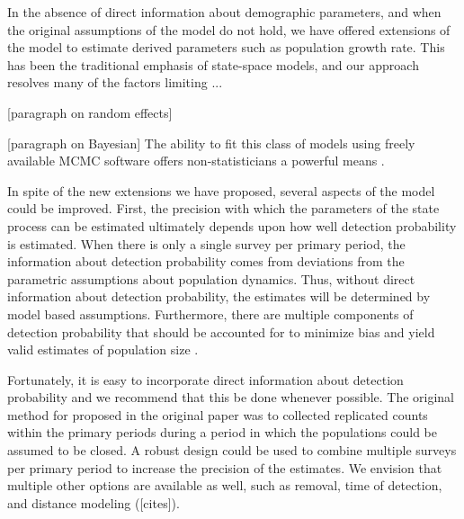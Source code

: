 \documentclass[12pt]{article}
\begin{document}
In the absence of direct information about demographic parameters, and
when the original assumptions of the model do not hold, we have
offered extensions of the model to estimate derived parameters such as
population growth rate. This has been the traditional emphasis of
state-space models, and our approach resolves many of the factors
limiting ...

[paragraph on random effects]


[paragraph on Bayesian]
The ability to fit this class of models using freely available MCMC
software offers non-statisticians a powerful means .

In spite of the new extensions we have proposed, several aspects of
the model could be improved. First, the precision with which the
parameters of the state process can be estimated ultimately depends
upon how well detection probability is estimated. When there is only a
single survey per primary period, the information about detection
probability comes from deviations from the parametric assumptions
about population dynamics. Thus, without direct information about
detection probability, the estimates will be determined by model based
assumptions. Furthermore, there are multiple components of detection
probability that should be accounted for to minimize bias and yield
valid estimates of population size \citep{nichols_etal:2009}.

Fortunately, it is easy to incorporate direct information about
detection probability and we recommend that this be done whenever
possible. The original method for proposed in the original paper was
to collected replicated counts within the primary periods during a
period in which the populations could be assumed to be closed.  A
robust design could be used to combine multiple surveys per primary
period to increase the precision of the estimates. We envision that
multiple other options are available as well, such as removal, time of
detection, and distance modeling ([cites]).
\end{document}
